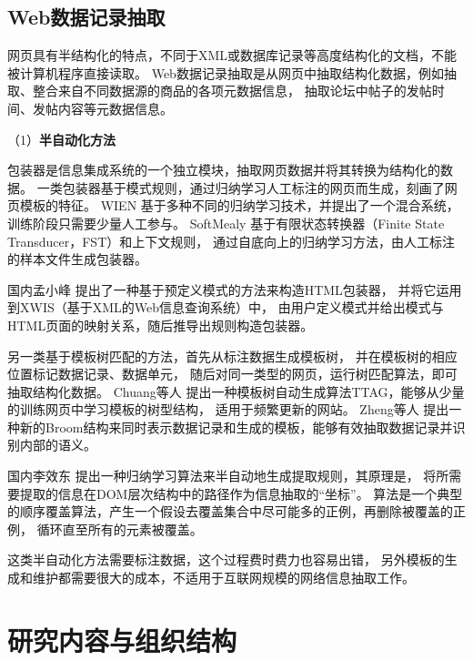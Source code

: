 \subsection{Web数据记录抽取}
网页具有半结构化的特点，不同于XML或数据库记录等高度结构化的文档，不能被计算机程序直接读取。
Web数据记录抽取是从网页中抽取结构化数据，例如抽取、整合来自不同数据源的商品的各项元数据信息，
抽取论坛中帖子的发帖时间、发帖内容等元数据信息。

（1）\textbf{半自动化方法}

包装器是信息集成系统的一个独立模块，抽取网页数据并将其转换为结构化的数据。
一类包装器基于模式规则，通过归纳学习人工标注的网页而生成，刻画了网页模板的特征。
WIEN 
基于多种不同的归纳学习技术，并提出了一个混合系统，训练阶段只需要少量人工参与。
SoftMealy 
基于有限状态转换器（Finite State Transducer，FST）和上下文规则，
通过自底向上的归纳学习方法，由人工标注的样本文件生成包装器。

国内孟小峰
提出了一种基于预定义模式的方法来构造HTML包装器，
并将它运用到XWIS（基于XML的Web信息查询系统）中，
由用户定义模式并给出模式与HTML页面的映射关系，随后推导出规则构造包装器。

另一类基于模板树匹配的方法，首先从标注数据生成模板树，
并在模板树的相应位置标记数据记录、数据单元，
随后对同一类型的网页，运行树匹配算法，即可抽取结构化数据。
Chuang等人
提出一种模板树自动生成算法TTAG，能够从少量的训练网页中学习模板的树型结构，
适用于频繁更新的网站。
Zheng等人
提出一种新的Broom结构来同时表示数据记录和生成的模板，能够有效抽取数据记录并识别内部的语义。

国内李效东
提出一种归纳学习算法来半自动地生成提取规则，其原理是，
将所需要提取的信息在DOM层次结构中的路径作为信息抽取的“坐标”。
算法是一个典型的顺序覆盖算法，产生一个假设去覆盖集合中尽可能多的正例，再删除被覆盖的正例，
循环直至所有的元素被覆盖。

这类半自动化方法需要标注数据，这个过程费时费力也容易出错，
另外模板的生成和维护都需要很大的成本，不适用于互联网规模的网络信息抽取工作。


\section{研究内容与组织结构}




